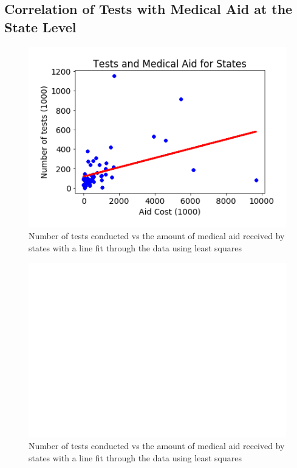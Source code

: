 \documentclass[11pt]{article}
\begin{document}
\subsection{Correlation of Tests with Medical Aid at the State Level}
\begin{figure}[h]
    \centering
    \includegraphics[scale=0.5]{diagrams/analysis/test_cost_fit.png}
    \caption{Number of tests conducted vs the amount of medical aid received by states with a line fit through the data using least squares}
    \label{fig:test_cost_fit}
\end{figure}

\FloatBarrier
\begin{figure}[h]
    \centering
    \includegraphics[scale=0.5]{diagrams/analysis/medaid_corr_no_outliers.png}
    \caption{Number of tests conducted vs the amount of medical aid received by states with a line fit through the data using least squares}
    \label{fig:test_cost_fit}
\end{figure}
\FloatBarrier
\end{document}
